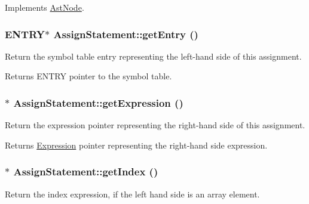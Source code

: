 Implements \hyperlink{classAstNode_a67b2d6ce1262da2954fb4db255759fb3}{AstNode}.\hypertarget{classAssignStatement_a4b640ab15accc35753ef8ae72c7b90fc}{
\subsubsection[{getEntry}]{\setlength{\rightskip}{0pt plus 5cm}ENTRY$\ast$ AssignStatement::getEntry ()}}
\label{classAssignStatement_a4b640ab15accc35753ef8ae72c7b90fc}
Return the symbol table entry representing the left-\/hand side of this assignment. \begin{DoxyReturn}{Returns}
ENTRY pointer to the symbol table. 
\end{DoxyReturn}
\hypertarget{classAssignStatement_a488cf9857d458c808b97471a1a3789df}{
\subsubsection[{getExpression}]{$\ast$ AssignStatement::getExpression ()}}
\label{classAssignStatement_a488cf9857d458c808b97471a1a3789df}
Return the expression pointer representing the right-\/hand side of this assignment. \begin{DoxyReturn}{Returns}
\hyperlink{classExpression}{Expression} pointer representing the right-\/hand side expression. 
\end{DoxyReturn}
\hypertarget{classAssignStatement_a89a46624c82d07ce4b4f4819c2d7df81}{
\subsubsection[{getIndex}]{$\ast$ AssignStatement::getIndex ()}}
\label{classAssignStatement_a89a46624c82d07ce4b4f4819c2d7df81}
Return the index expression, if the left hand side is an array element.


